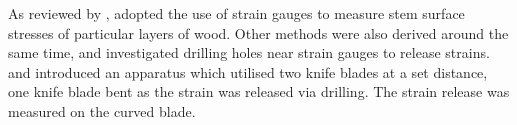 As reviewed by \citet{kubler_1987}, \citet{Okuyama_1981} adopted the use of strain gauges to measure stem surface
stresses of particular layers of wood. Other methods were also derived around
the same time, \citet{gueneau1973,gueneau1973b} and \citet{kikata1977} investigated drilling holes near strain gauges to release strains.
\citet{Gueneau1974} and \citet{Saurat_1976} introduced an apparatus which utilised two knife
blades at a set distance, one knife blade bent as the strain was released via
drilling. The strain release was measured on the curved blade. 

